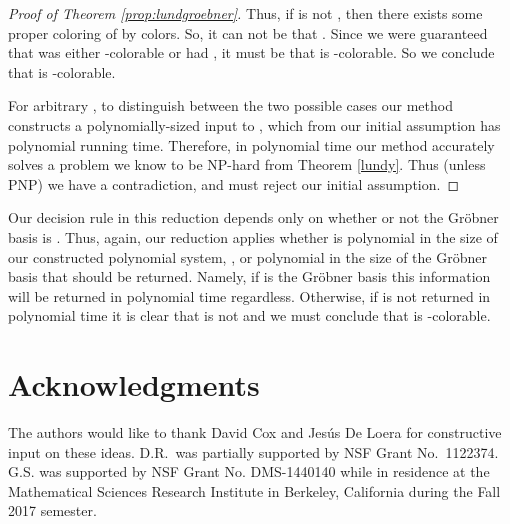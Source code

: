 \documentclass{article}
\begin{document}
\begin{proof}[Proof of Theorem \ref{prop:lundgroebner}]
Thus, if  is not , then there exists some proper coloring of  by  colors.
So, it can not be that . Since we were guaranteed that  was either \nobreakdash-colorable or had , it must be that  is \nobreakdash-colorable. So we conclude that  is \nobreakdash-colorable.

For arbitrary , to distinguish between the two possible cases our method constructs a polynomially-sized input to , which from our initial assumption has polynomial running time. Therefore, in polynomial time our method accurately solves a problem we know to be NP-hard from Theorem \ref{lundy}. Thus (unless PNP) we have a contradiction, and must reject our initial assumption. 
\end{proof}

Our decision rule in this reduction depends only on whether or not the Gr\"{o}bner basis is . Thus, again, our reduction applies whether   is polynomial in the size of our constructed polynomial system, , or polynomial in the size of the Gr\"{o}bner basis that should be returned. Namely, if  is the Gr\"{o}bner basis this information will be returned in polynomial time regardless. Otherwise, if  is not returned in polynomial time it is clear that  is not  and we must conclude that  is \nobreakdash-colorable.

































\section*{Acknowledgments}
\noindent The authors would like to thank David Cox and Jes\'us De Loera for constructive input on these ideas.  D.R.~was partially supported by NSF Grant No.~1122374. G.S. was supported  by NSF Grant No. DMS-1440140 while in residence at the Mathematical Sciences Research Institute in Berkeley, California during the Fall 2017 semester.



\end{document}
